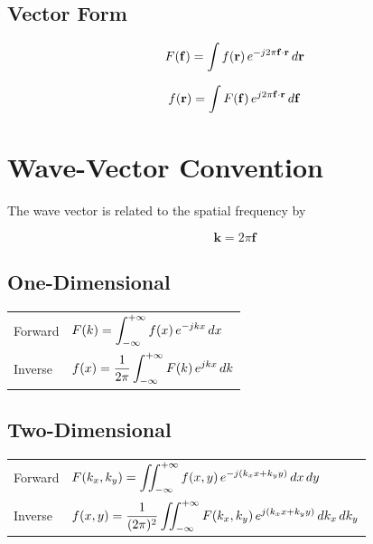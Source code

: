 \subsection*{Vector Form}

\[
F(\mathbf{f})
=
\int
f(\mathbf{r})\,
e^{-j2\pi\mathbf{f}\cdot\mathbf{r}}
\,d\mathbf{r}
\]

\[
f(\mathbf{r})
=
\int
F(\mathbf{f})\,
e^{j2\pi\mathbf{f}\cdot\mathbf{r}}
\,d\mathbf{f}
\]
\newpage
\section{Wave-Vector Convention}

The wave vector is related to the spatial frequency by

\[
\boxed{\mathbf{k}=2\pi\mathbf{f}}
\]

\subsection*{One-Dimensional}

\begin{center}
\begin{tabular}{ll}
\toprule
Forward &
$\displaystyle
F(k)=
\int_{-\infty}^{+\infty}
f(x)\,
e^{-j kx}\,
dx
$
\\[0.6cm]

Inverse &
$\displaystyle
f(x)=
\frac{1}{2\pi}
\int_{-\infty}^{+\infty}
F(k)\,
e^{j kx}\,
dk
$
\\
\bottomrule
\end{tabular}
\end{center}


\subsection*{Two-Dimensional}

\begin{center}
\begin{tabular}{ll}
\toprule
Forward &
$\displaystyle
F(k_x,k_y)=
\iint_{-\infty}^{+\infty}
f(x,y)\,
e^{-j(k_x x+k_y y)}\,
dx\,dy
$
\\[0.6cm]

Inverse &
$\displaystyle
f(x,y)=
\frac{1}{(2\pi)^2}
\iint_{-\infty}^{+\infty}
F(k_x,k_y)\,
e^{j(k_x x+k_y y)}\,
dk_x\,dk_y
$
\\
\bottomrule
\end{tabular}
\end{center}

